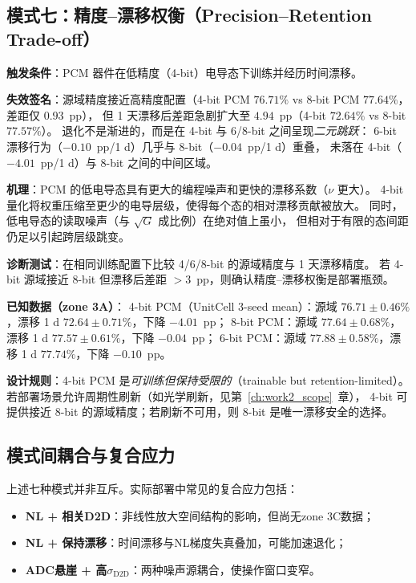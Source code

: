 \subsection{模式七：精度--漂移权衡（Precision--Retention Trade-off）}
\label{subsec:failure_precision_retention}

\textbf{触发条件}：PCM 器件在低精度（4-bit）电导态下训练并经历时间漂移。

\textbf{失效签名}：源域精度接近高精度配置（4-bit PCM $76.71\%$ vs 8-bit PCM $77.64\%$，差距仅 $0.93$~pp），
但 1 天漂移后差距急剧扩大至 $4.94$~pp（4-bit $72.64\%$ vs 8-bit $77.57\%$）。
退化不是渐进的，而是在 4-bit 与 6/8-bit 之间呈现\emph{二元跳跃}：
6-bit 漂移行为（$-0.10$~pp/1 d）几乎与 8-bit（$-0.04$~pp/1 d）重叠，
未落在 4-bit（$-4.01$~pp/1 d）与 8-bit 之间的中间区域。

\textbf{机理}：PCM 的低电导态具有更大的编程噪声和更快的漂移系数（$\nu$ 更大）。
4-bit 量化将权重压缩至更少的电导层级，使得每个态的相对漂移贡献被放大。
同时，低电导态的读取噪声（与 $\sqrt{G}$ 成比例）在绝对值上虽小，
但相对于有限的态间距仍足以引起跨层级跳变。

\textbf{诊断测试}：在相同训练配置下比较 4/6/8-bit 的源域精度与 1 天漂移精度。
若 4-bit 源域接近 8-bit 但漂移后差距 $>3$~pp，则确认精度--漂移权衡是部署瓶颈。

\textbf{已知数据（zone 3A）}：
4-bit PCM（UnitCell 3-seed mean）：源域 $76.71\pm0.46\%$，漂移 1 d $72.64\pm0.71\%$，下降 $-4.01$~pp；
8-bit PCM：源域 $77.64\pm0.68\%$，漂移 1 d $77.57\pm0.61\%$，下降 $-0.04$~pp；
6-bit PCM：源域 $77.88\pm0.58\%$，漂移 1 d $77.74\%$，下降 $-0.10$~pp。

\textbf{设计规则}：4-bit PCM 是\emph{可训练但保持受限的}（trainable but retention-limited）。
若部署场景允许周期性刷新（如光学刷新，见第~\ref{ch:work2_scope}~章），
4-bit 可提供接近 8-bit 的源域精度；若刷新不可用，则 8-bit 是唯一漂移安全的选择。

\subsection{模式间耦合与复合应力}
\label{subsec:failure_compound}

上述七种模式并非互斥。实际部署中常见的复合应力包括：
\begin{itemize}
    \item \textbf{NL + 相关D2D}：非线性放大空间结构的影响，但尚无zone 3C数据；
    \item \textbf{NL + 保持漂移}：时间漂移与NL梯度失真叠加，可能加速退化；
    \item \textbf{ADC悬崖 + 高$\sigma_{\mathrm{D2D}}$}：两种噪声源耦合，使操作窗口变窄。
\end{itemize}

